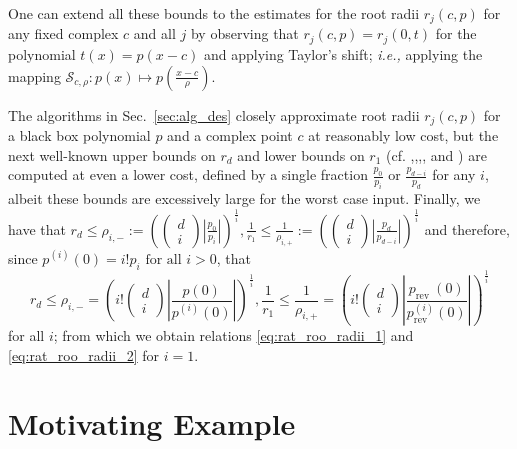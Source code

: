 \documentclass[sigconf]{acmart}
\begin{document}

One can extend all these bounds to the estimates for the root radii $r_{j}(c, p)$ for any fixed complex $c$ and all $j$ by observing that $r_{j}(c, p)=r_{j}(0, t)$ for the polynomial $t(x)=p(x-c)$ and applying Taylor's shift; \emph{i.e.,} applying the mapping $\mathcal{S}_{c ,\rho }:p(x) \mapsto p\left( \frac{x - c}{\rho} \right)$.

The algorithms in Sec.~\ref{sec:alg_des} closely approximate root radii $r_{j}(c, p)$ for a black box polynomial $p$ and a complex point $c$ at reasonably low cost, but the next well-known upper bounds on $r_{d}$ and lower bounds on $r_{1}$ (cf. \cite{kerimov1977applied},\cite{carstensen1991inclusion},\cite{pan2000approximating},\cite{bini2000design}, and \cite{bini2014solving}) are computed at even a lower cost, defined by a single fraction $\frac{p_{0}}{p_{i}}$ or $\frac{p_{d-i}}{p_{d}}$ for any $i$, albeit these bounds are excessively large for the worst case input.
Finally, we have that
$r_{d} \leq \rho_{i,-}:=\left(\left(\begin{array}{c}d \\ i\end{array}\right)\left|\frac{p_{0}}{p_{i}}\right|\right)^{\frac{1}{i}}, \frac{1}{r_{1}} \leq \frac{1}{\rho_{i,+}}:=\left(\left(\begin{array}{l}d \\ i\end{array}\right)\left|\frac{p_{d}}{p_{d-i}}\right|\right)^{\frac{1}{i}}$
and therefore, since $p^{(i)}(0)=i ! p_{i} \text { for all } i>0$, that
\begin{equation}\label{eq:last_appen}
r_{d} \leq \rho_{i,-}=\left(i !\left(\begin{array}{c}
d \\
i
\end{array}\right)\left|\frac{p(0)}{p^{(i)}(0)}\right|\right)^{\frac{1}{i}}, \frac{1}{r_{1}} \leq \frac{1}{\rho_{i,+}}=\left(i !\left(\begin{array}{c}
d \\
i
\end{array}\right)\left|\frac{p_{\text {rev }}(0)}{p_{\text {rev }}^{(i)}(0)}\right|\right)^{\frac{1}{i}}
\end{equation}
for all $i$; from which we obtain relations \ref{eq:rat_roo_radii_1} and \ref{eq:rat_roo_radii_2} for $i=1$.

\section{Motivating Example}
\end{document}
